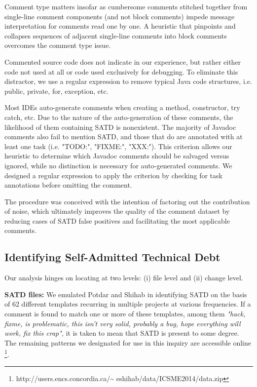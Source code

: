 Comment type matters insofar as cumbersome comments stitched together from single-line comment components (and not block comments) impede message interpretation for comments read one by one. A heuristic that pinpoints and collapses sequences of adjacent single-line comments into block comments overcomes the comment type issue.\par



Commented source code does not indicate \SATD in our experience, but rather either code not used at all or code used exclusively for debugging. To eliminate this distractor, we use a regular expression to remove typical Java code structures, i.e. public, private, for, exception, etc.\par


Most IDEs auto-generate comments when creating a method, constructor, try catch, etc. Due to the nature of the auto-generation of these comments, the likelihood of them containing SATD is nonexistent. The majority of Javadoc comments also fail to mention SATD, and those that do are annotated with at least one task (i.e. "TODO:", "FIXME:", "XXX:"). This criterion allows our heuristic to determine which Javadoc comments should be salvaged versus ignored, while no distinction is necessary for auto-generated comments. We designed a regular expression to apply the criterion by checking for task annotations before omitting the comment.\par




The procedure was conceived with the intention of factoring out the contribution of noise, which ultimately improves the quality of the comment dataset by reducing cases of SATD false positives and facilitating the most applicable comments.\par



\subsection{Identifying Self-Admitted Technical Debt}
\label{ch4_td}


Our analysis hinges on locating \SATD at two levels: (i) file level and (ii) change level.

\noindent\textbf{SATD files:}
We emulated Potdar and Shihab \cite{ICSM_PotdarS14} in identifying SATD on the basis of 62 different templates recurring in multiple projects at various frequencies. If a comment is found to match one or more of these templates, among them \textit{"hack, fixme, is problematic, this isn't very solid, probably a bug, hope everything will work, fix this crap"}, it is taken to mean that SATD is present to some degree. The remaining patterns we designated for use in this inquiry are accessible online \footnote{http://users.encs.concordia.ca/\textasciitilde
eshihab/data/ICSME2014/data.zip}.


